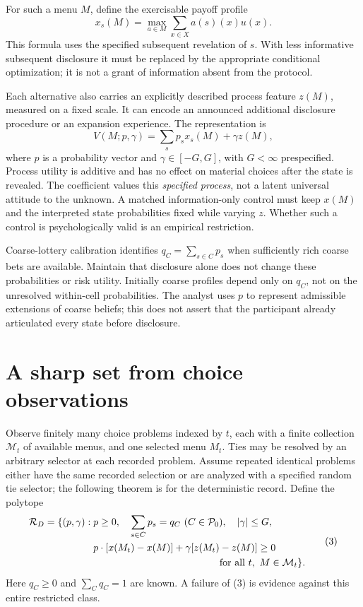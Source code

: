 \documentclass[11pt]{article}
\theoremstyle{remark}
\begin{document}
For such a menu $M$, define the exercisable payoff profile
\[
 x_s(M)=\max_{a\in M}\sum_{x\in X}a(s)(x)u(x).           \tag{1}
\]
This formula uses the specified subsequent revelation of $s$. With less informative subsequent disclosure it must be replaced by the appropriate conditional optimization; it is not a grant of information absent from the protocol.

Each alternative also carries an explicitly described process feature $z(M)$, measured on a fixed scale. It can encode an announced additional disclosure procedure or an expansion experience. The representation is
\[
 V(M;p,\gamma)=\sum_sp_sx_s(M)+\gamma z(M),               \tag{2}
\]
where $p$ is a probability vector and $\gamma\in[-G,G]$, with $G<\infty$ prespecified. Process utility is additive and has no effect on material choices after the state is revealed. The coefficient values this \emph{specified process}, not a latent universal attitude to the unknown. A matched information-only control must keep $x(M)$ and the interpreted state probabilities fixed while varying $z$. Whether such a control is psychologically valid is an empirical restriction.

Coarse-lottery calibration identifies $q_C=\sum_{s\in C}p_s$ when sufficiently rich coarse bets are available. Maintain that disclosure alone does not change these probabilities or risk utility. Initially coarse profiles depend only on $q_C$, not on the unresolved within-cell probabilities. The analyst uses $p$ to represent admissible extensions of coarse beliefs; this does not assert that the participant already articulated every state before disclosure.

\section{A sharp set from choice observations}
Observe finitely many choice problems indexed by $t$, each with a finite collection $\mathcal M_t$ of available menus, and one selected menu $M_t$. Ties may be resolved by an arbitrary selector at each recorded problem. Assume repeated identical problems either have the same recorded selection or are analyzed with a specified random tie selector; the following theorem is for the deterministic record. Define the polytope
\[
\begin{aligned}
 \mathcal R_D=\{(p,\gamma):\;&p\geq0,\quad \sum_{s\in C}p_s=q_C
                     \ (C\in\mathcal P_0),\quad |\gamma|\leq G,\\
 &p\cdot[x(M_t)-x(M)]+\gamma[z(M_t)-z(M)]\geq0\\
 &\hspace{45mm}\text{for all }t,\ M\in\mathcal M_t\}.
                                                               \end{aligned}\tag{3}
\]
Here $q_C\geq0$ and $\sum_Cq_C=1$ are known. A failure of (3) is evidence against this entire restricted class.
\end{document}

